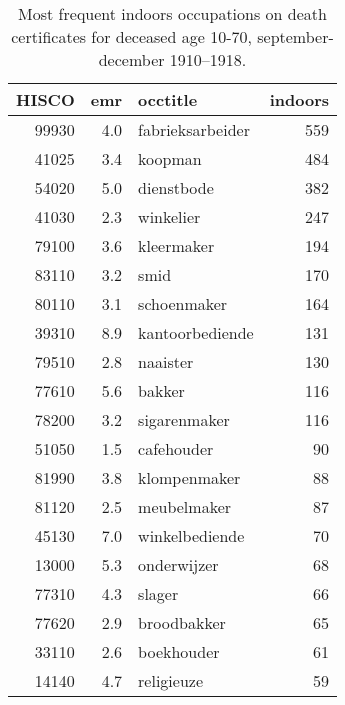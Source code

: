 \begin{table}

\caption{\label{tab:tab:topindoors}Most frequent indoors occupations on death certificates for deceased age 10-70, september-december 1910–1918.}
\centering
\begin{tabular}[t]{r|r|l|r}
\hline
HISCO & emr & occtitle & indoors\\
\hline
99930 & 4.0 & fabrieksarbeider & 559\\
\hline
41025 & 3.4 & koopman & 484\\
\hline
54020 & 5.0 & dienstbode & 382\\
\hline
41030 & 2.3 & winkelier & 247\\
\hline
79100 & 3.6 & kleermaker & 194\\
\hline
83110 & 3.2 & smid & 170\\
\hline
80110 & 3.1 & schoenmaker & 164\\
\hline
39310 & 8.9 & kantoorbediende & 131\\
\hline
79510 & 2.8 & naaister & 130\\
\hline
77610 & 5.6 & bakker & 116\\
\hline
78200 & 3.2 & sigarenmaker & 116\\
\hline
51050 & 1.5 & cafehouder & 90\\
\hline
81990 & 3.8 & klompenmaker & 88\\
\hline
81120 & 2.5 & meubelmaker & 87\\
\hline
45130 & 7.0 & winkelbediende & 70\\
\hline
13000 & 5.3 & onderwijzer & 68\\
\hline
77310 & 4.3 & slager & 66\\
\hline
77620 & 2.9 & broodbakker & 65\\
\hline
33110 & 2.6 & boekhouder & 61\\
\hline
14140 & 4.7 & religieuze & 59\\
\hline
\end{tabular}
\end{table}
